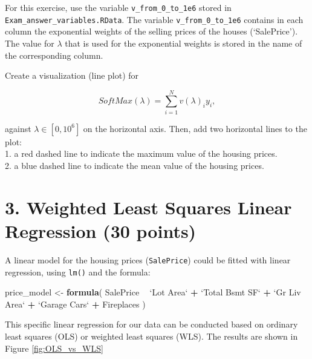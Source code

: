 \documentclass[]{article}
\newenvironment{Shaded}{\begin{snugshade}}{\end{snugshade}}
\newcommand{\KeywordTok}[1]{\textcolor[rgb]{0.13,0.29,0.53}{\textbf{#1}}}
\newcommand{\DataTypeTok}[1]{\textcolor[rgb]{0.13,0.29,0.53}{#1}}
\newcommand{\StringTok}[1]{\textcolor[rgb]{0.31,0.60,0.02}{#1}}
\newcommand{\OperatorTok}[1]{\textcolor[rgb]{0.81,0.36,0.00}{\textbf{#1}}}
\newcommand{\NormalTok}[1]{#1}
\begin{document}
For this exercise, use the variable \texttt{v\_from\_0\_to\_1e6} stored
in \texttt{Exam\_answer\_variables.RData}. The variable
\texttt{v\_from\_0\_to\_1e6} contains in each column the exponential
weights of the selling prices of the houses (`SalePrice'). The value for
\(\lambda\) that is used for the exponential weights is stored in the
name of the corresponding column.

Create a visualization (line plot) for

\begin{equation}
SoftMax(\lambda) = \sum^{N}_{i = 1} v(\lambda)_i y_i,
\end{equation}

against \(\lambda \in [0, 10^6]\) on the horizontal axis. Then, add two
horizontal lines to the plot:\\
1. a red dashed line to indicate the maximum value of the housing
prices.\\
2. a blue dashed line to indicate the mean value of the housing prices.

\newpage

\section{3. Weighted Least Squares Linear Regression (30
points)}\label{weighted-least-squares-linear-regression-30-points}

A linear model for the housing prices (\texttt{SalePrice}) could be
fitted with linear regression, using \texttt{lm()} and the formula:

\begin{Shaded}
\begin{Highlighting}[]
\NormalTok{price_model <-}\StringTok{ }\KeywordTok{formula}\NormalTok{(}
\NormalTok{  SalePrice }\OperatorTok{~}\StringTok{ `}\DataTypeTok{Lot Area}\StringTok{`} \OperatorTok{+}\StringTok{ `}\DataTypeTok{Total Bsmt SF}\StringTok{`} \OperatorTok{+}\StringTok{ }
\StringTok{    `}\DataTypeTok{Gr Liv Area}\StringTok{`} \OperatorTok{+}\StringTok{ `}\DataTypeTok{Garage Cars}\StringTok{`} \OperatorTok{+}\StringTok{ }\NormalTok{Fireplaces}
\NormalTok{)}
\end{Highlighting}
\end{Shaded}

This specific linear regression for our data can be conducted based on
ordinary least squares (OLS) or weighted least squares (WLS). The
results are shown in Figure \ref{fig:OLS_vs_WLS}

\FloatBarrier
\end{document}

